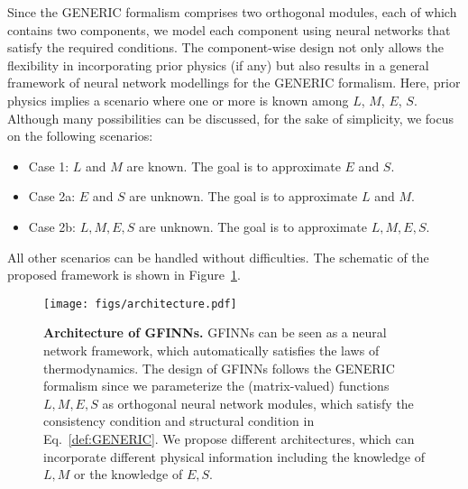 \documentclass[openacc]{rsproca_new}%
\begin{document}
Since the GENERIC formalism comprises two orthogonal modules,
each of which contains two components, 
we model each component using neural networks
that satisfy the required conditions.
The component-wise design not only allows the flexibility in incorporating prior physics (if any) but also results in a general framework of neural network modellings for the GENERIC formalism.
Here, prior physics implies a scenario where 
one or more
is known among $L$, $M$, $E$, $S$.
Although many possibilities can be discussed, 
for the sake of simplicity, 
we focus on the following scenarios:
\begin{itemize}
    \item Case 1: $L$ and $M$ are known.
    The goal is to approximate 
    $E$ and $S$.
    \item Case 2a: 
    $E$ and $S$ are unknown. 
    The goal is to approximate $L$ and $M$.
    \item Case 2b: 
    $L, M, E, S$ are unknown. 
    The goal is to approximate $L, M, E, S$.
\end{itemize}
All other scenarios can be handled without difficulties. 
The schematic of the proposed framework 
is shown in Figure~\ref{fig:architecture}.
\begin{figure}[ht]
    \centering
    \texttt{[image: figs/architecture.pdf]}
    \caption{\textbf{Architecture of GFINNs.} GFINNs can be seen as a neural network framework, which automatically satisfies the laws of thermodynamics. The design of GFINNs follows the GENERIC formalism since we parameterize the (matrix-valued) functions $L,M,E,S$ as orthogonal neural network modules, which satisfy the consistency condition and structural condition in Eq.~\ref{def:GENERIC}. We propose different architectures, which can incorporate different physical information including the knowledge of $L,M$ or the knowledge of $E,S$.}
    \label{fig:architecture}
\end{figure}


\end{document}
